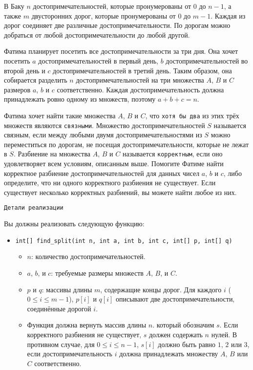 В Баку $n$ достопримечательностей, которые пронумерованы от $0$ до $n-1$, а также $m$
двусторонних дорог, которые пронумерованы от $0$ до $m-1$. Каждая из дорог
соединяет две различные достопримечательности. По дорогам можно добраться
от любой достопримечательности до любой другой.

Фатима планирует посетить все достопримечательности за три дня. Она хочет
посетить $a$ достопримечательностей в первый день, $b$ достопримечательностей во
второй день и $c$ достопримечательностей в третий день. Таким образом, она
собирается разделить $n$ достопримечательностей на три множества $A$, $B$ и $C$
размеров $a$, $b$ и $c$ соответственно. Каждая достопримечательность должна
принадлежать ровно одному из множеств, поэтому $a + b + c = n$.

Фатима хочет найти такие множества $A$, $B$ и $C$, что \texttt{хотя бы два} из этих трёх
множеств являются \texttt{связными}. Множество достопримечательностей $S$
называется связным, если между любыми двумя достопримечательностями из $S$
можно переместиться по дорогам, не посещая достопримечательности, которые
не лежат в $S$. Разбиение на множества $A$, $B$ и $C$ называется \texttt{корректным}, если
оно удовлетворяет всем условиям, описанным выше.
Помогите Фатиме найти корректное разбиение достопримечательностей для
данных чисел $a$, $b$ и $c$, либо определите, что ни одного корректного разбиения не
существует. Если существует несколько корректных разбиений, вы можете найти
любое из них.

\texttt{Детали реализации}

Вы должны реализовать следующую функцию:

\begin{itemize}
\item \texttt{int[] find\_split(int n, int a, int b, int c, int[] p, int[] q)}
\begin{itemize}
\item $n$: количество достопримечательностей.
\item $a$, $b$, и $c$: требуемые размеры множеств $A$, $B$, и $C$.
\item $p$ и $q$: массивы длины $m$, содержащие концы дорог. Для каждого $i$ ($0 \leq i \leq m-1$), $p[i]$ и $q[i]$ описывают две достопримечательности,
соединённые дорогой $i$.
\item Функция должна вернуть массив длины $n$. который обозначим $s$.
Если корректного разбиения не существует, $s$ должен содержать $n$ нулей.
В противном случае, для $0 \leq i \leq n-1$, $s[i]$ должно быть равно $1$, $2$ или $3$, если достопримечательность $i$ должна принадлежать множеству $A$, $B$ или $C$ соответственно.
\end{itemize}
\end{itemize}



